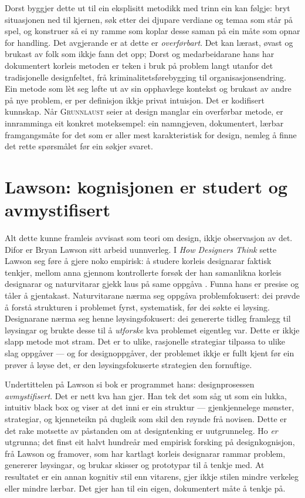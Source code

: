 Dorst byggjer dette ut til ein eksplisitt metodikk med trinn ein kan følgje: bryt situasjonen ned til kjernen, søk etter dei djupare verdiane og temaa som står på spel, og konstruer så ei ny ramme som koplar desse saman på ein måte som opnar for handling. Det avgjerande er at dette er \emph{overførbart}. Det kan lærast, øvast og brukast av folk som ikkje fann det opp; Dorst og medarbeidarane hans har dokumentert korleis metoden er teken i bruk på problem langt utanfor det tradisjonelle designfeltet, frå kriminalitetsførebygging til organisasjonsendring. Ein metode som lèt seg løfte ut av sin opphavlege kontekst og brukast av andre på nye problem, er per definisjon ikkje privat intuisjon. Det er kodifisert kunnskap. Når \textsc{Grunnlaust} seier at design manglar ein overførbar metode, er innramminga eit konkret moteksempel: ein namngjeven, dokumentert, lærbar framgangsmåte for det som er aller mest karakteristisk for design, nemleg å finne det rette spørsmålet før ein søkjer svaret.

\section{Lawson: kognisjonen er studert og avmystifisert}

Alt dette kunne framleis avvisast som teori om design, ikkje observasjon av det. Difor er Bryan Lawson sitt arbeid uunnverleg. I \emph{How Designers Think} sette Lawson seg føre å gjere noko empirisk: å studere korleis designarar faktisk tenkjer, mellom anna gjennom kontrollerte forsøk der han samanlikna korleis designarar og naturvitarar gjekk laus på same oppgåva \autocite{lawson1980}. Funna hans er presise og tåler å gjentakast. Naturvitarane nærma seg oppgåva problemfokusert: dei prøvde å forstå strukturen i problemet fyrst, systematisk, før dei søkte ei løysing. Designarane nærma seg henne løysingsfokusert: dei genererte tidleg framlegg til løysingar og brukte desse til å \emph{utforske} kva problemet eigentleg var. Dette er ikkje slapp metode mot stram. Det er to ulike, rasjonelle strategiar tilpassa to ulike slag oppgåver — og for designoppgåver, der problemet ikkje er fullt kjent før ein prøver å løyse det, er den løysingsfokuserte strategien den fornuftige.

Undertittelen på Lawson si bok er programmet hans: designprosessen \emph{avmystifisert}. Det er nett kva han gjer. Han tek det som såg ut som ein lukka, intuitiv black box og viser at det inni er ein struktur — gjenkjennelege mønster, strategiar, og kjenneteikn på dugleik som skil den røynde frå novisen. Dette er det rake motsette av påstanden om at designtenking er uutgrunneleg. Ho \emph{er} utgrunna; det finst eit halvt hundreår med empirisk forsking på designkognisjon, frå Lawson og framover, som har kartlagt korleis designarar rammar problem, genererer løysingar, og brukar skisser og prototypar til å tenkje med. At resultatet er ein annan kognitiv stil enn vitarens, gjer ikkje stilen mindre verkeleg eller mindre lærbar. Det gjer han til ein eigen, dokumentert måte å tenkje på.

